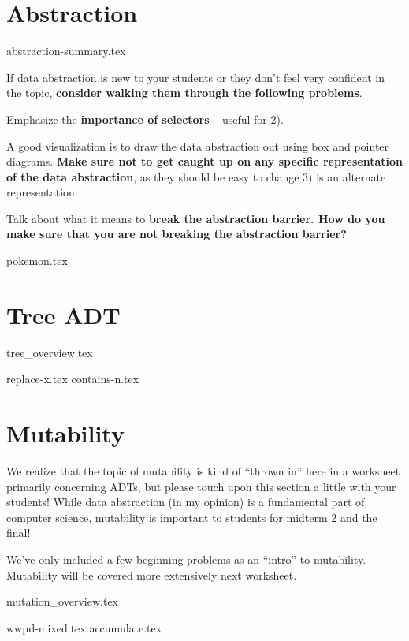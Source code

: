 \documentclass{exam}
\begin{document}
\section{Abstraction}
{abstraction-summary.tex}
\begin{meta}
    If data abstraction is new to your students or they don't feel very confident in the topic, \textbf{consider walking them through the following problems}.
    
    Emphasize the \textbf{importance of selectors} -- useful for 2).
    
    A good visualization is to draw the data abstraction out using box and pointer diagrams. \textbf{Make sure not to get caught up on any specific representation of the data abstraction}, as they should be easy to change 3) is an alternate representation.
    
    Talk about what it means to \textbf{break the abstraction barrier. How do you make sure that you are not breaking the abstraction barrier?}
\end{meta}
\begin{questions}
    {pokemon.tex}
\end{questions}

\newpage
\section{Tree ADT}
{tree_overview.tex}
\begin{questions}
    {replace-x.tex}
    {contains-n.tex}
\end{questions}

\newpage
\section{Mutability}
\begin{meta}
    We realize that the topic of mutability is kind of ``thrown in'' here in a worksheet primarily concerning ADTs, but please touch upon this section a little with your students! While data abstraction (in my opinion) is a fundamental part of computer science, mutability is important to students for midterm 2 and the final!

    We've only included a few beginning problems as an ``intro'' to mutability. Mutability will be covered more extensively next worksheet.
\end{meta}
{mutation_overview.tex}
\begin{questions}
    {wwpd-mixed.tex}
    {accumulate.tex}
\end{questions}
\end{document}
